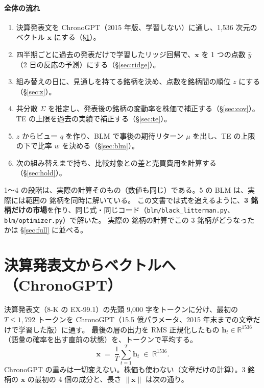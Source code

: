 \documentclass[xelatex,ja=standard,jafont=haranoaji,a4paper,10pt]{bxjsarticle}
\newcommand{\code}[1]{\texttt{#1}}
\begin{document}
\paragraph{全体の流れ}
\begin{enumerate}
\item 決算発表文を ChronoGPT（2015 年版、学習しない）に通し、1,536 次元のベクトル $\bm x$ にする（\S\ref{sec:vec}）。
\item 四半期ごとに過去の発表だけで学習したリッジ回帰で、$\bm x$ を 1 つの点数 $\hat y$（2 日の反応の予測）にする（\S\ref{sec:ridge}）。
\item 組み替えの日に、見通しを持てる銘柄を決め、点数を銘柄間の順位 $z$ にする（\S\ref{sec:z}）。
\item 共分散 $\Sigma$ を推定し、発表後の銘柄の変動率を株価で補正する（\S\ref{sec:cov}）。TE の上限を過去の実績で補正する（\S\ref{sec:te}）。
\item $z$ からビュー $q$ を作り、BLM で事後の期待リターン $\mu$ を出し、TE の上限の下で比率 $w$ を決める（\S\ref{sec:blm}）。
\item 次の組み替えまで持ち、比較対象との差と売買費用を計算する（\S\ref{sec:hold}）。
\end{enumerate}

\begin{notebox}[3 銘柄の計算と実際の計算の違い]
1〜4 の段階は、実際の計算そのもの（数値も同じ）である。5 の BLM は、実際には範囲の  銘柄を同時に解いている。
この文書では式を追えるように、\textbf{3 銘柄だけの市場}を作り、同じ式・同じコード（\code{blm/black\_litterman.py}、\code{blm/optimizer.py}）で解いた。
実際の  銘柄の計算でこの 3 銘柄がどうなったかは \S\ref{sec:full} に並べる。
\end{notebox}

\section{決算発表文からベクトルへ（ChronoGPT）}\label{sec:vec}

決算発表文（8-K の EX-99.1）の先頭 9,000 字をトークンに分け、最初の $T\le 1{,}792$ トークンを ChronoGPT（15.5 億パラメータ、2015 年末までの文章だけで学習した版）に通す。
最後の層の出力を RMS 正規化したもの $\bm h_t\in\mathbb R^{1536}$（語彙の確率を出す直前の状態）を、トークンで平均する。
\[
  \bm x \;=\; \frac{1}{T}\sum_{t=1}^{T}\bm h_t \;\in\; \mathbb R^{1536}.
\]
ChronoGPT の重みは一切変えない。株価も使わない（文章だけの計算）。3 銘柄の $\bm x$ の最初の 4 個の成分と、長さ $\|\bm x\|$ は次の通り。
\end{document}
